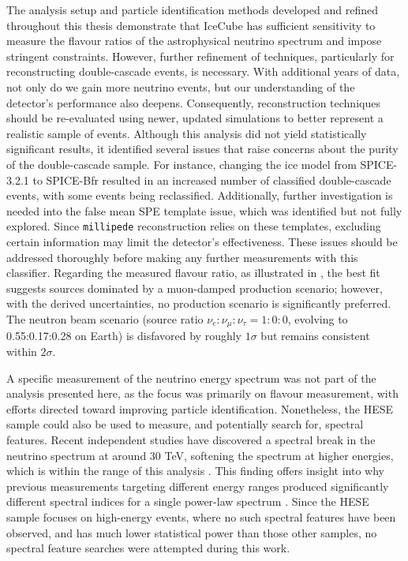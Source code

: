 The analysis setup and particle identification methods developed and refined throughout this thesis demonstrate that IceCube has sufficient sensitivity to measure the flavour ratios of the astrophysical neutrino spectrum and impose stringent constraints. However, further refinement of techniques, particularly for reconstructing double-cascade events, is necessary. With additional years of data, not only do we gain more neutrino events, but our understanding of the detector’s performance also deepens. Consequently, reconstruction techniques should be re-evaluated using newer, updated simulations to better represent a realistic sample of events. Although this analysis did not yield statistically significant results, it identified several issues that raise concerns about the purity of the double-cascade sample. For instance, changing the ice model from SPICE-3.2.1 to SPICE-Bfr resulted in an increased number of classified double-cascade events, with some events being reclassified. Additionally, further investigation is needed into the false mean SPE template issue, which was identified but not fully explored. Since \texttt{millipede} reconstruction relies on these templates, excluding certain information may limit the detector’s effectiveness. These issues should be addressed thoroughly before making any further measurements with this classifier. Regarding the measured flavour ratio, as illustrated in , the best fit suggests sources dominated by a muon-damped production scenario; however, with the derived uncertainties, no production scenario is significantly preferred. The neutron beam scenario (source ratio $\nu_e:\nu_{\mu}:\nu_{\tau} = 1:0:0$, evolving to 0.55:0.17:0.28 on Earth) is disfavored by roughly $1\sigma$ but remains consistent within $2\sigma$.

A specific measurement of the neutrino energy spectrum was not part of the analysis presented here, as the focus was primarily on flavour measurement, with efforts directed toward improving particle identification. Nonetheless, the HESE sample could also be used to measure, and potentially search for, spectral features. Recent independent studies have discovered a spectral break in the neutrino spectrum at around 30 TeV, softening the spectrum at higher energies, which is within the range of this analysis . This finding offers insight into why previous measurements targeting different energy ranges produced significantly different spectral indices for a single power-law spectrum . Since the HESE sample focuses on high-energy events, where no such spectral features have been observed, and has much lower statistical power than those other samples, no spectral feature searches were attempted during this work.

